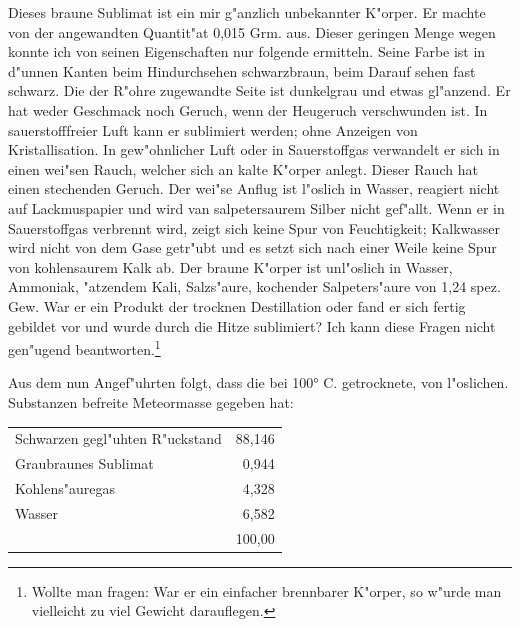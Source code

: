 \documentclass[a4paper, 11pt, oneside]{article}
\begin{document}
Dieses braune Sublimat ist ein mir g"anzlich unbekannter K"orper. Er machte von der angewandten Quantit"at 0,015 Grm. aus. Dieser geringen Menge wegen konnte ich von seinen Eigenschaften nur folgende ermitteln. Seine Farbe ist in d"unnen Kanten beim Hindurchsehen schwarzbraun, beim Darauf sehen fast schwarz. Die der R"ohre zugewandte Seite ist dunkelgrau und etwas gl"anzend. Er hat weder Geschmack noch Geruch, wenn der Heugeruch verschwunden ist. In sauerstofffreier Luft kann er sublimiert werden; ohne Anzeigen von Kristallisation. In gew"ohnlicher Luft oder in Sauerstoffgas verwandelt er sich in einen wei"sen Rauch, welcher sich an kalte K"orper anlegt. Dieser Rauch hat einen stechenden Geruch. Der wei"se Anflug ist l"oslich in Wasser, reagiert nicht auf Lackmuspapier und wird van salpetersaurem Silber nicht gef"allt. Wenn er in Sauerstoffgas verbrennt wird, zeigt sich keine Spur von Feuchtigkeit; Kalkwasser wird nicht von dem Gase getr"ubt und es setzt sich nach einer Weile keine Spur von kohlensaurem Kalk ab. Der braune K"orper ist unl"oslich in Wasser, Ammoniak, "atzendem Kali, Salzs"aure, kochender Salpeters"aure von 1,24 spez. Gew. War er ein Produkt der trocknen Destillation oder fand er sich fertig gebildet vor und wurde durch die Hitze sublimiert? Ich kann diese Fragen nicht gen"ugend beantworten.\footnote{Wollte man fragen: War er ein einfacher brennbarer K"orper, so w"urde man vielleicht zu viel Gewicht darauflegen.}

Aus dem nun Angef"uhrten folgt, dass die bei 100° C. getrocknete, von l"oslichen. Substanzen befreite Meteormasse gegeben hat:
\begin{center}
\begin{tabular}{ l r }
    Schwarzen gegl"uhten R"uckstand & 88,146\\
    Graubraunes Sublimat & 0,944\\
    Kohlens"auregas & 4,328\\
    Wasser & 6,582\\
    & 100,00\\
\end{tabular}
\end{center}
\end{document}
